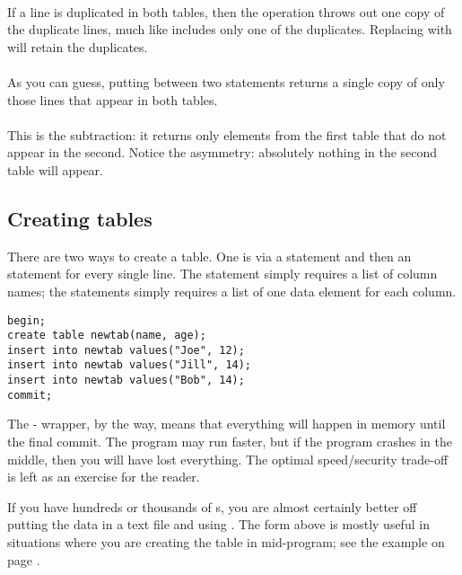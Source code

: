 \paragraph{} If a line is duplicated in both tables,
then the  operation throws out
one copy of the duplicate lines, much like 
includes only one of the duplicates. Replacing  with  will retain the duplicates.

\paragraph{} As you can guess,
putting  between two  statements
returns a single copy of only those lines that appear in both tables.

\paragraph{} This is the subtraction: it returns only
elements from the first table that do not appear in the second. Notice
the asymmetry: absolutely nothing in the second table will appear. 

\subsection{Creating tables} There are two ways to create a table. One
is via  a  statement and then an  statement
for every single line. The  statement simply requires a
list of column names; the  statements simply requires a
list of one data element for each column.
\begin{lstlisting}
begin;
create table newtab(name, age);
insert into newtab values("Joe", 12);
insert into newtab values("Jill", 14);
insert into newtab values("Bob", 14);
commit;
\end{lstlisting}

The - wrapper, by the way, means that everything
will happen in memory until the final commit. The program may run
faster, but if the program crashes in the middle, then you will have
lost everything.  The optimal speed/security trade-off is left as an
exercise for the reader.

If you have hundreds or thousands of s, you are almost certainly better off putting the data
in a text file and using . The form
above is mostly useful in situations where you are creating the table in mid-program; see the example on page \pageref{createeg}.


